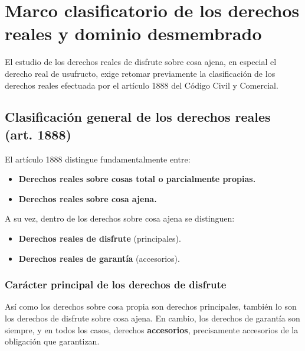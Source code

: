 \documentclass[12pt,oneside]{book}
\begin{document}

\chapter[Marco clasificatorio y dominio desmembrado]{Marco clasificatorio de los derechos reales y dominio desmembrado}

El estudio de los derechos reales de disfrute sobre cosa ajena, en especial el derecho real de usufructo, exige retomar previamente la clasificación de los derechos reales efectuada por el artículo 1888 del Código Civil y Comercial.

\section{Clasificación general de los derechos reales (art. 1888)}

El artículo 1888 distingue fundamentalmente entre:

\begin{itemize}
    \item \textbf{Derechos reales sobre cosas total o parcialmente propias.}
    \item \textbf{Derechos reales sobre cosa ajena.}
\end{itemize}

A su vez, dentro de los derechos sobre cosa ajena se distinguen:

\begin{itemize}
    \item \textbf{Derechos reales de disfrute} (principales).
    \item \textbf{Derechos reales de garantía} (accesorios).
\end{itemize}

\subsection{Carácter principal de los derechos de disfrute}

Así como los derechos sobre cosa propia son derechos principales, también lo son los derechos de disfrute sobre cosa ajena. En cambio, los derechos de garantía son siempre, y en todos los casos, derechos \textbf{accesorios}, precisamente accesorios de la obligación que garantizan.
\end{document}
